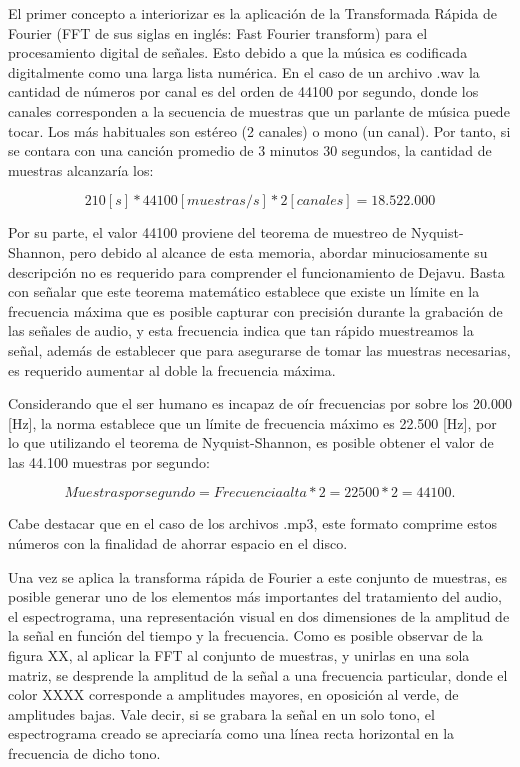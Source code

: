\bigskip

El primer concepto a interiorizar es la aplicación de la Transformada Rápida de Fourier (FFT de sus siglas en inglés: Fast Fourier transform) para el procesamiento digital de señales. Esto debido a que la música es codificada digitalmente como una larga lista numérica. En el caso de un archivo .wav la cantidad de números por canal es del orden de 44100 por segundo, donde los canales corresponden a la secuencia de muestras que un parlante de música puede tocar. Los más habituales son estéreo (2 canales) o mono (un canal). Por tanto, si se contara con una canción promedio de 3 minutos 30 segundos, la cantidad de muestras alcanzaría los:

\begin{equation*}
210 [s]* 44100[muestras/s]*2[canales] = 18.522.000
\end{equation*}

Por su parte, el valor 44100 proviene del teorema de muestreo de Nyquist-Shannon, pero debido al alcance de esta memoria, abordar minuciosamente su descripción no es requerido para comprender el funcionamiento de Dejavu. Basta con señalar que este teorema matemático establece que existe un límite en la frecuencia máxima que es posible capturar con precisión durante la grabación de las señales de audio, y esta frecuencia indica que tan rápido muestreamos la señal, además de establecer que para asegurarse de tomar las muestras necesarias, es requerido aumentar al doble la frecuencia máxima. 

\bigskip

Considerando que el ser humano es incapaz de oír frecuencias por sobre los 20.000 [Hz], la norma establece que un límite de frecuencia máximo es 22.500 [Hz], por lo que utilizando el teorema de Nyquist-Shannon, es posible obtener el valor de las 44.100 muestras por segundo:

\begin{equation*}
Muestras por segundo = Frecuencia alta * 2 = 22500*2 = 44100.
\end{equation*}

Cabe destacar que en el caso de los archivos .mp3, este formato comprime estos números con la finalidad de ahorrar espacio en el disco.

\bigskip

Una vez se aplica la transforma rápida de Fourier a este conjunto de muestras, es posible generar uno de los elementos más importantes del tratamiento del audio, el espectrograma, una representación visual en dos dimensiones de la amplitud de la señal en función del tiempo y la frecuencia. Como es posible observar de la figura XX, al aplicar la FFT al conjunto de muestras, y unirlas en una sola matriz, se desprende la amplitud de la señal a una frecuencia particular, donde el color XXXX corresponde a amplitudes mayores, en oposición al verde, de amplitudes bajas. Vale decir, si se grabara la señal en un solo tono, el espectrograma creado se apreciaría como una línea recta horizontal en la frecuencia de dicho tono.


